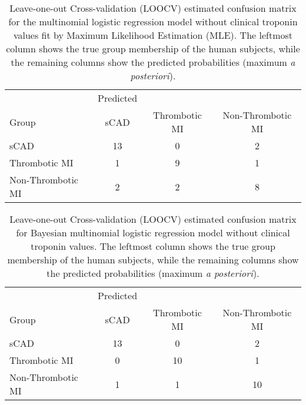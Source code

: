 \begin{DoubleSpace*}
\begin{table}[H]
 	\caption[Leave-one-out Cross-validation (LOOCV) estimated confusion matrix for the multinomial logistic regression model without clinical troponin values fit by Maximum Likelihood Estimation]{Leave-one-out Cross-validation (LOOCV) estimated confusion matrix for the multinomial logistic regression model without clinical troponin values fit by Maximum Likelihood Estimation (MLE). The leftmost column shows the true group membership of the human subjects, while the remaining columns show the predicted probabilities (maximum \emph{a posteriori}).}
\label{tab:modelRes0}
\begin{tabular}{l|ccc}
& Predicted & & \\
Group  &     sCAD & Thrombotic MI & Non-Thrombotic MI \\
\hline
sCAD & 13 &  0 & 2\\
Thrombotic MI &   1 & 9 &  1\\
Non-Thrombotic MI  & 2  & 2 & 8 
\end{tabular}
\end{table}

 \begin{table}[H]
\centering
\caption[Leave-one-out Cross-validation (LOOCV) estimated confusion matrix for Bayesian multinomial logistic regression model without clinical troponin values]{Leave-one-out Cross-validation (LOOCV) estimated confusion matrix for Bayesian multinomial logistic regression model without clinical troponin values. The leftmost column shows the true group membership of the human subjects, while the remaining columns show the predicted probabilities (maximum \emph{a posteriori}).}
\label{tab:modelRes}
\begin{tabular}{l|ccc}
& Predicted & & \\
Group  &     sCAD & Thrombotic MI & Non-Thrombotic MI \\
\hline
sCAD   &     13    &     0    &     2\\
Thrombotic MI  &  0    &    10    &     1\\
Non-Thrombotic MI &   1    &     1   &     10
\end{tabular}
 \end{table}
 

\end{DoubleSpace*}
